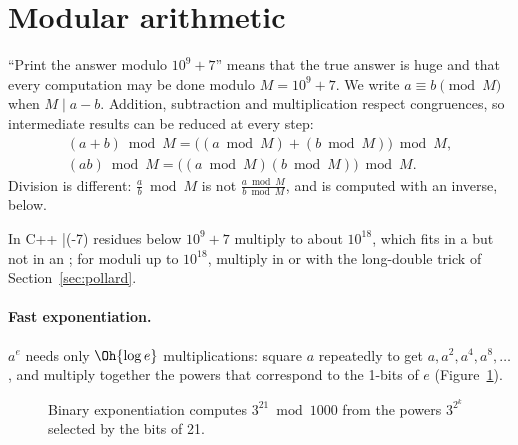 \section[Modular arithmetic]{Modular arithmetic \hfill \gold}\label{sec:modular}

``Print the answer modulo $10^9 + 7$'' means that the true answer is huge and that every computation may be done modulo $M = 10^9 + 7$.
We write $a \equiv b \pmod M$ when $M \mid a - b$. Addition, subtraction and multiplication respect congruences, so intermediate
results can be reduced at every step:
\begin{gather*}
  (a + b) \bmod M = \bigl((a \bmod M) + (b \bmod M)\bigr) \bmod M, \\
  (a b) \bmod M = \bigl((a \bmod M)(b \bmod M)\bigr) \bmod M .
\end{gather*}
Division is different: $\frac{a}{b} \bmod M$ is not $\frac{a \bmod M}{b \bmod M}$, and is computed with an inverse, below.

\begin{pitfall}
In C++ \cc|(-7) %
residues below $10^9 + 7$ multiply to about $10^{18}$, which fits in a  but not in an ; for moduli up to
$10^{18}$, multiply in  or with the long-double trick of Section~\ref{sec:pollard}.
\end{pitfall}

\paragraph{Fast exponentiation.} $a^e$ needs only $\Oh{\log e}$ multiplications: square $a$ repeatedly to get $a, a^2, a^4, a^8,
\dots$, and multiply together the powers that correspond to the 1-bits of $e$ (Figure~\ref{fig:binexp}).

\begin{figure}[htbp]
\centering
{}
\caption{Binary exponentiation computes $3^{21} \bmod 1000$ from the powers $3^{2^k}$ selected by the bits of 21.}
\label{fig:binexp}
\end{figure}

